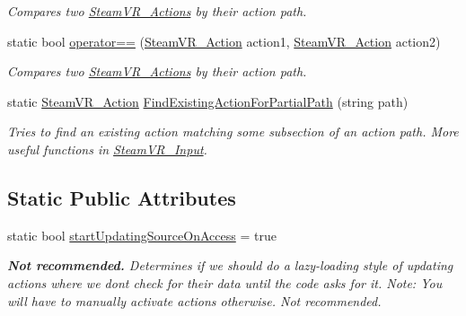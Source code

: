 \begin{DoxyCompactItemize}
\begin{DoxyCompactList}\small\item\em Compares two \mbox{\hyperlink{class_valve_1_1_v_r_1_1_steam_v_r___actions}{Steam\+V\+R\+\_\+\+Actions}} by their action path. \end{DoxyCompactList}\item 
static bool \mbox{\hyperlink{class_valve_1_1_v_r_1_1_steam_v_r___action_a58a25d1d89f51b0ddcc65ebf6c1e8e54}{operator==}} (\mbox{\hyperlink{class_valve_1_1_v_r_1_1_steam_v_r___action}{Steam\+V\+R\+\_\+\+Action}} action1, \mbox{\hyperlink{class_valve_1_1_v_r_1_1_steam_v_r___action}{Steam\+V\+R\+\_\+\+Action}} action2)
\begin{DoxyCompactList}\small\item\em Compares two \mbox{\hyperlink{class_valve_1_1_v_r_1_1_steam_v_r___actions}{Steam\+V\+R\+\_\+\+Actions}} by their action path. \end{DoxyCompactList}\item 
static \mbox{\hyperlink{class_valve_1_1_v_r_1_1_steam_v_r___action}{Steam\+V\+R\+\_\+\+Action}} \mbox{\hyperlink{class_valve_1_1_v_r_1_1_steam_v_r___action_aa10a1be562d9c134f16601b579ec6e65}{Find\+Existing\+Action\+For\+Partial\+Path}} (string path)
\begin{DoxyCompactList}\small\item\em Tries to find an existing action matching some subsection of an action path. More useful functions in \mbox{\hyperlink{class_valve_1_1_v_r_1_1_steam_v_r___input}{Steam\+V\+R\+\_\+\+Input}}. \end{DoxyCompactList}\end{DoxyCompactItemize}
\subsection*{Static Public Attributes}
\begin{DoxyCompactItemize}
\item 
static bool \mbox{\hyperlink{class_valve_1_1_v_r_1_1_steam_v_r___action_ae27e9858dec18a4307cca7779ed87ad8}{start\+Updating\+Source\+On\+Access}} = true
\begin{DoxyCompactList}\small\item\em {\bfseries{Not recommended.}} Determines if we should do a lazy-\/loading style of updating actions where we don\textquotesingle{}t check for their data until the code asks for it. Note\+: You will have to manually activate actions otherwise. Not recommended. \end{DoxyCompactList}\end{DoxyCompactItemize}
